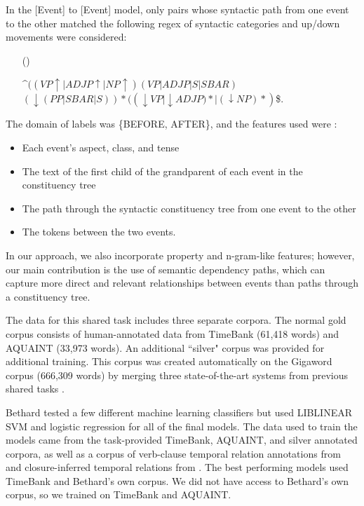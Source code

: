 \documentclass[11pt]{article}
\begin{document}
In the [Event] to [Event] model, only pairs whose syntactic path from one event to the other matched the following regex of syntactic categories and up/down movements were considered:

\begin{itemize}

\item[(\exampleno)] \label{syntax_regex}

\^{}$((VP\uparrow|ADJP\uparrow|NP\uparrow)(VP|ADJP|S|SBAR)$\\ $(\downarrow(PP|SBAR|S))*(({\downarrow}VP|{\downarrow}ADJP)*|({\downarrow}NP)*)$\$.
\end{itemize}


The domain of labels was \{BEFORE, AFTER\}, and the features used were \cite{Bethard:13}:

\begin{itemize}
\item Each event's aspect, class, and tense
\item The text of the first child of the grandparent of each event in the constituency tree
\item The path through the syntactic constituency tree from one event to the other
\item The tokens between the two events.
\end{itemize}

In our approach, we also incorporate property and n-gram-like features; however, our main contribution is the use of semantic dependency paths, which can capture more direct and relevant relationships between events than paths through a constituency tree.

The data for this shared task includes three separate corpora. The normal gold corpus consists of human-annotated data from TimeBank (61,418 words) and AQUAINT (33,973 words). An additional ``silver" corpus was provided for additional training. This corpus was created automatically on the Gigaword corpus (666,309 words) by merging three state-of-the-art systems from previous shared tasks \cite{UzZaman:13}.

Bethard tested a few different machine learning classifiers but used LIBLINEAR SVM and logistic regression for all of the final models. The data used to train the models came from the task-provided TimeBank, AQUAINT, and silver annotated corpora, as well as a corpus of verb-clause temporal relation annotations from  and closure-inferred temporal relations from . The best performing models used TimeBank and Bethard's own corpus. We did not have access to Bethard's own corpus, so we trained on TimeBank and AQUAINT.
\end{document}
